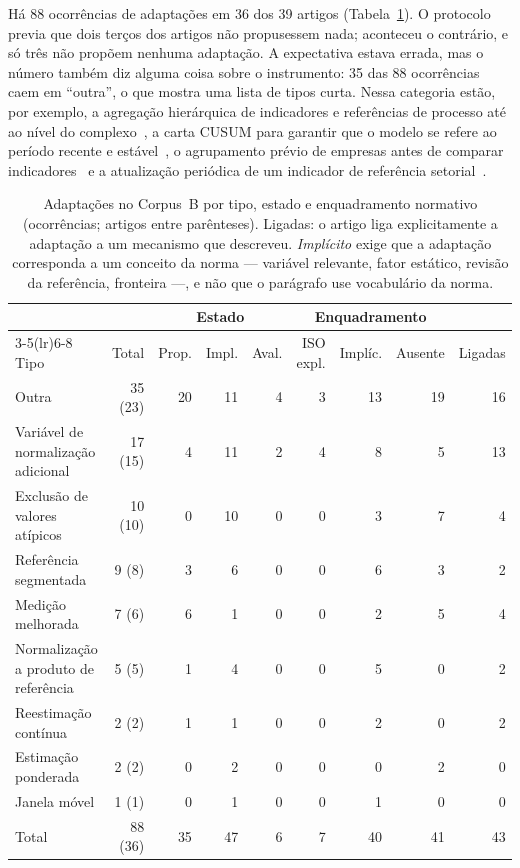 Há 88 ocorrências de adaptações em 36 dos 39 artigos
(Tabela~\ref{tab:b-adaptacoes}). O protocolo previa que dois terços dos
artigos não propusessem nada; aconteceu o contrário, e só três não propõem
nenhuma adaptação. A expectativa estava errada, mas o número também diz
alguma coisa sobre o instrumento: 35 das 88 ocorrências caem em ``outra'',
o que mostra uma lista de tipos curta. Nessa categoria estão, por exemplo,
a agregação hierárquica de indicadores e referências de processo até ao
nível do complexo~\cite{Beisheim2020}, a carta CUSUM para garantir que o
modelo se refere ao período recente e estável~\cite{Giacone2012}, o
agrupamento prévio de empresas antes de comparar indicadores~\cite{Bonfa2017}
e a atualização periódica de um indicador de referência
setorial~\cite{Boyd2013,Boyd2017}.

\begin{table}[htbp]
  \centering
  \footnotesize
  \caption[Adaptações por tipo, estado e enquadramento]{Adaptações no
  Corpus~B por tipo, estado e enquadramento normativo (ocorrências; artigos
  entre parênteses). Ligadas: o artigo liga explicitamente a adaptação a um
  mecanismo que descreveu. \emph{Implícito} exige que a adaptação corresponda
  a um conceito da norma --- variável relevante, fator estático, revisão da
  referência, fronteira ---, e não que o parágrafo use vocabulário da norma.}
  \label{tab:b-adaptacoes}
  \begin{tabular}{lrrrrrrrr}
    \toprule
    & & \multicolumn{3}{c}{Estado} & \multicolumn{3}{c}{Enquadramento} & \\
    \cmidrule(lr){3-5}\cmidrule(lr){6-8}
    Tipo & Total & Prop. & Impl. & Aval. & ISO expl. & Implíc. & Ausente & Ligadas \\
    \midrule
    Outra & 35 (23) & 20 & 11 & 4 & 3 & 13 & 19 & 16 \\
    Variável de normalização adicional & 17 (15) & 4 & 11 & 2 & 4 & 8 & 5 & 13 \\
    Exclusão de valores atípicos & 10 (10) & 0 & 10 & 0 & 0 & 3 & 7 & 4 \\
    Referência segmentada & 9 (8) & 3 & 6 & 0 & 0 & 6 & 3 & 2 \\
    Medição melhorada & 7 (6) & 6 & 1 & 0 & 0 & 2 & 5 & 4 \\
    Normalização a produto de referência & 5 (5) & 1 & 4 & 0 & 0 & 5 & 0 & 2 \\
    Reestimação contínua & 2 (2) & 1 & 1 & 0 & 0 & 2 & 0 & 2 \\
    Estimação ponderada & 2 (2) & 0 & 2 & 0 & 0 & 0 & 2 & 0 \\
    Janela móvel & 1 (1) & 0 & 1 & 0 & 0 & 1 & 0 & 0 \\
    \midrule
    Total & 88 (36) & 35 & 47 & 6 & 7 & 40 & 41 & 43 \\
    \bottomrule
  \end{tabular}
\end{table}

